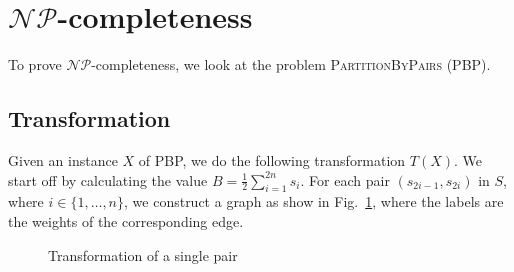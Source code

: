 \section{$\mathcal{NP}$-completeness}

To prove $\mathcal{NP}$-completeness, we look at the problem \textsc{PartitionByPairs} (PBP). 

\subsection{Transformation}
Given an instance $X$ of PBP, we do the following transformation $T(X)$. We start off by calculating the value $B = \frac{1}{2}\sum_{i=1}^{2n} s_i$. For each pair $(s_{2i-1}, s_{2i})$ in $S$,  where $i \in \lbrace 1,\dots, n \rbrace $, we construct a graph as show in Fig.~\ref{fig:transform1}, where the labels are the weights of the corresponding edge. 

\begin{figure}[!htb]
\centering
{}
\caption{Transformation of a single pair}
\label{fig:transform1}
\end{figure}

